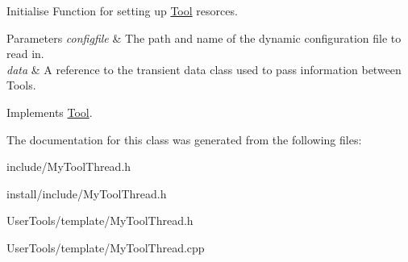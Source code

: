 Initialise Function for setting up \hyperlink{classTool}{Tool} resorces. 


\begin{DoxyParams}{Parameters}
{\em configfile} & The path and name of the dynamic configuration file to read in. \\
\hline
{\em data} & A reference to the transient data class used to pass information between Tools. \\
\hline
\end{DoxyParams}


Implements \hyperlink{classTool_a4b04a99172dfe09dc97927d1feaff0ce}{Tool}.



The documentation for this class was generated from the following files\-:\begin{DoxyCompactItemize}
\item 
include/My\-Tool\-Thread.\-h\item 
install/include/My\-Tool\-Thread.\-h\item 
User\-Tools/template/My\-Tool\-Thread.\-h\item 
User\-Tools/template/My\-Tool\-Thread.\-cpp\end{DoxyCompactItemize}
